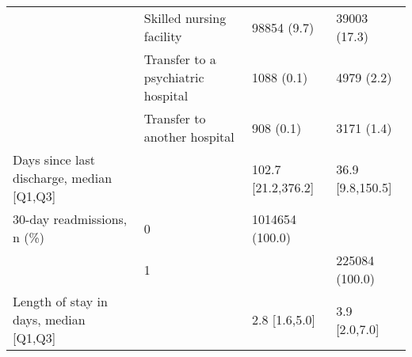 \begin{tabular}{llll}
                                       & Skilled nursing facility &                    98854 (9.7) &      39003 (17.3) \\
                                       & Transfer to a psychiatric hospital &                     1088 (0.1) &        4979 (2.2) \\
                                       & Transfer to another hospital &                      908 (0.1) &        3171 (1.4) \\
Days since last discharge, median [Q1,Q3] &   &             102.7 [21.2,376.2] &  36.9 [9.8,150.5] \\
30-day readmissions, n (\%) & 0 &                1014654 (100.0) &                   \\
                                       & 1 &                                &    225084 (100.0) \\
Length of stay in days, median [Q1,Q3] &   &                  2.8 [1.6,5.0] &     3.9 [2.0,7.0] \\
\bottomrule
\end{tabular}
